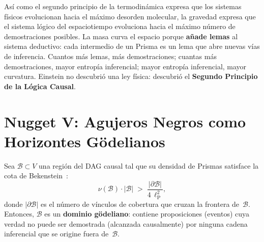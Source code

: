 \documentclass[11pt, a4paper, openany]{book}
\newcommand{\lP}{\ell_{\mathrm{P}}}
\begin{document}
\begin{result}[title={La Gravedad como Segundo Principio de la
L\'ogica}]
\label{res:stone-gravity-logic}
As\'i como el segundo principio de la termodin\'amica expresa que los
sistemas f\'isicos evolucionan hacia el m\'aximo desorden molecular,
la gravedad expresa que el sistema l\'ogico del espaciotiempo
evoluciona hacia el m\'aximo n\'umero de demostraciones posibles. La
masa curva el espacio porque \textbf{a\~nade lemas} al sistema
deductivo: cada intermedio de un Prisma es un lema que abre nuevas
v\'ias de inferencia. Cuantos m\'as lemas, m\'as demostraciones;
cuantas m\'as demostraciones, mayor entrop\'ia inferencial; mayor
entrop\'ia inferencial, mayor curvatura. Einstein no descubri\'o una
ley f\'isica: descubri\'o el \textbf{Segundo Principio de la
L\'ogica Causal}.
\end{result}

\section{Nugget V: Agujeros Negros como Horizontes G\"odelianos}

\begin{theorem}
\label{thm:godel-horizon}
Sea $\mathcal{B} \subset V$ una regi\'on del DAG causal tal que su
densidad de Prismas satisface la cota de
Bekenstein~\cite{bekenstein1981}:
\begin{equation}
  \nu(\mathcal{B}) \cdot |\mathcal{B}|
  \;>\;
  \frac{|\partial \mathcal{B}|}{4\,\lP^2},
  \label{eq:bekenstein-logical}
\end{equation}
donde $|\partial \mathcal{B}|$ es el n\'umero de v\'inculos de
cobertura que cruzan la frontera de~$\mathcal{B}$. Entonces,
$\mathcal{B}$ es un \textbf{dominio g\"odeliano}: contiene
proposiciones (eventos) cuya verdad no puede ser demostrada
(alcanzada causalmente) por ninguna cadena inferencial que se
origine fuera de~$\mathcal{B}$.
\end{theorem}
\end{document}
